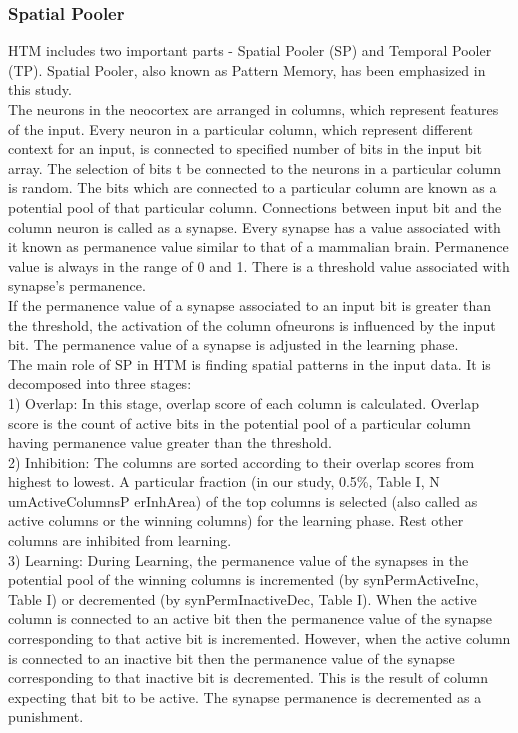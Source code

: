 \documentclass[12pt]{article}
\begin{document}
\begin{multicols}{2}
\subsubsection{Spatial Pooler}
HTM includes two important parts - Spatial Pooler (SP) and Temporal Pooler (TP). Spatial Pooler, also known as Pattern Memory, has been emphasized in this study.\\
The neurons in the neocortex are arranged in columns, which represent features of the input. Every neuron in a particular column, which represent different context for an input, is connected to specified number of bits in the input bit array. The selection of bits t be connected to the neurons in a particular column is random. The bits which are connected
to a particular column are known as a potential pool of that particular column. Connections between input bit and the column neuron is called as a synapse. Every synapse has a
value associated with it known as permanence value similar to that of a mammalian brain. Permanence value is always in the range of 0 and 1. There is a threshold value associated
with synapse’s permanence.\\
If the permanence value of a synapse associated to an input bit is greater than the threshold, the activation of the column ofneurons is influenced by the input bit. The permanence value of a synapse is adjusted in the learning phase.\\
The main role of SP in HTM is finding spatial patterns in
the input data. It is decomposed into three stages:\\
1) Overlap: In this stage, overlap score of each column
is calculated. Overlap score is the count of active bits in the
potential pool of a particular column having permanence value
greater than the threshold.\\
2) Inhibition: The columns are sorted according
to their overlap scores from highest to lowest. A
particular fraction (in our study, 0.5\%, Table I,
N umActiveColumnsP erInhArea) of the top columns
is selected (also called as active columns or the winning
columns) for the learning phase. Rest other columns are
inhibited from learning.\\
3) Learning: During Learning, the permanence value of
the synapses in the potential pool of the winning columns is
incremented (by synPermActiveInc, Table I) or decremented
(by synPermInactiveDec, Table I). When the active column
is connected to an active bit then the permanence value of
the synapse corresponding to that active bit is incremented.
However, when the active column is connected to an inactive
bit then the permanence value of the synapse corresponding to
that inactive bit is decremented. This is the result of column
expecting that bit to be active. The synapse permanence is
decremented as a punishment.


\end{multicols}
\end{document}
